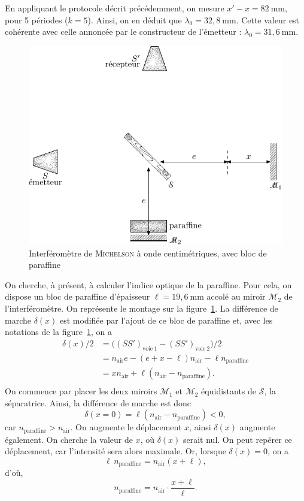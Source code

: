 \documentclass[a4paper,twocolumn,10pt,margin=0.5in]{extreport}
\def\res#1{{\color{cyan}#1}}
\begin{document}
	En appliquant le protocole décrit précédemment, on mesure \res{$x' - x = 82\:\mathrm{mm}$}, pour 5 périodes ($k = 5$).
	Ainsi, on en déduit que \res{$\lambda_0 = 32{,}8\:\mathrm{mm}$}.
	Cette valeur est cohérente avec celle annoncée par le constructeur de l'émetteur : $\lambda_0 = 31{,}6\:\mathrm{mm}$.

	\begin{figure}[H]
		\centering
		\includegraphics[width=\linewidth]{figures/michelson-2.pdf}
		\caption{Interféromètre de \textsc{Michelson} à onde centimétriques, avec bloc de paraffine}
		\label{fig:montage-paraffine}
	\end{figure}

	On cherche, à présent, à calculer l'indice optique de la paraffine.
	Pour cela, on dispose un bloc de paraffine d'épaisseur \res{$\ell = 19{,}6\:\mathrm{mm}$} accolé au miroir $\mathcal{M}_2$ de l'interféromètre.
	On représente le montage sur la figure~\ref{fig:montage-paraffine}.
	La différence de marche $\delta(x)$ est modifiée par l'ajout de ce bloc de paraffine et, avec les notations de la figure~\ref{fig:montage-paraffine}, on a
	\begin{align*}
		\delta(x) / 2 &= \big((SS')_{\mathrm{voie\ 1}} - (SS')_{\mathrm{voie\ 2}}\big) / 2\\
		&= n_\mathrm{air} e - (e + x - \ell) n_\mathrm{air}  - \ell n_\mathrm{paraffine} \\
		&= x n_\mathrm{air}  + \ell(n_\mathrm{air} - n _\mathrm{paraffine}). \\
	\end{align*}
	On commence par placer les deux miroirs $\mathcal{M}_1$ et $\mathcal{M}_2$ équidistants de $\mathcal{S}$, la séparatrice.
	Ainsi, la différence de marche est donc \[
		\delta(x=0) = \ell (n_\mathrm{air} - n_\mathrm{paraffine}) < 0
	,\] car $n_\mathrm{paraffine} > n_\mathrm{air}$.
	On augmente le déplacement $x$, ainsi $\delta(x)$ augmente également.
	On cherche la valeur de $x$, où $\delta(x)$ serait nul.
	On peut repérer ce déplacement, car l'intensité sera alors maximale.
	Or, lorsque $\delta(x) = 0$, on a \[
		\ell\, n_\mathrm{paraffine}  = n_\mathrm{air} (x + \ell),
	\]d'où, \[
		n_\mathrm{paraffine} = n_\mathrm{air} \cdot \frac{x + \ell}{\ell}
	.\]
\end{document}
